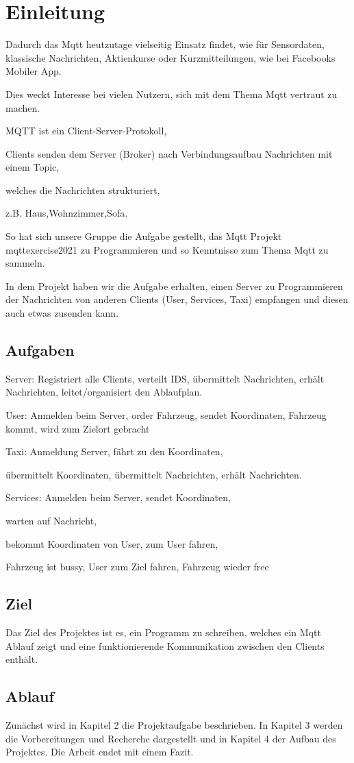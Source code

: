 \section{Einleitung}
Dadurch das Mqtt heutzutage vielseitig Einsatz findet,
wie für Sensordaten, klassische Nachrichten, 
Aktienkurse oder Kurzmitteilungen,
wie bei Facebooks Mobiler App. 


Dies weckt Interesse bei vielen Nutzern, 
sich mit dem Thema Mqtt vertraut zu machen.


MQTT ist ein Client-Server-Protokoll, 

Clients senden dem Server (Broker) 
nach Verbindungsaufbau Nachrichten mit einem Topic, 

welches die Nachrichten strukturiert, 

z.B. Haus,Wohnzimmer,Sofa.


So hat sich unsere Gruppe die Aufgabe gestellt, 
das Mqtt Projekt mqttexercise2021 zu Programmieren und so Kenntnisse zum Thema Mqtt zu sammeln.


In dem Projekt haben wir die Aufgabe erhalten, 
einen Server zu Programmieren der Nachrichten von anderen Clients (User, Services, Taxi) empfangen und diesen auch etwas zusenden kann.


\subsection{Aufgaben}

Server: Registriert alle Clients, verteilt IDS, übermittelt Nachrichten, 
erhält Nachrichten, leitet/organisiert den Ablaufplan.


User: Anmelden beim Server, order Fahrzeug, sendet Koordinaten, Fahrzeug kommt, wird zum Zielort gebracht


Taxi: Anmeldung Server, fährt zu den Koordinaten, 

übermittelt Koordinaten, übermittelt Nachrichten, erhält Nachrichten.


Services: Anmelden beim Server, sendet Koordinaten, 

warten auf Nachricht, 

bekommt Koordinaten von User, zum User fahren, 

Fahrzeug ist  bussy, User zum Ziel fahren, Fahrzeug wieder free

\subsection{Ziel}

Das Ziel des Projektes ist es, ein Programm zu schreiben, welches ein Mqtt Ablauf zeigt und eine funktionierende Kommunikation zwischen den Clients enthält.

\subsection{Ablauf}
Zunächst wird in Kapitel 2 die Projektaufgabe beschrieben. In Kapitel 3 werden die Vorbereitungen und Recherche dargestellt und in Kapitel 4 der Aufbau des Projektes. Die Arbeit endet mit einem Fazit. 







